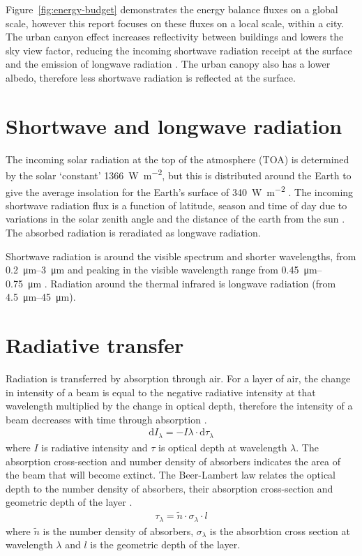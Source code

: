 \documentclass[a4paper,titlepage, twoside]{report}
\begin{document}
Figure~\ref{fig:energy-budget} demonstrates the energy balance fluxes on a global scale, however this report focuses on these fluxes on a local scale, within a city. The urban canyon effect increases reflectivity between buildings and lowers the sky view factor, reducing the incoming shortwave radiation receipt at the surface and the emission of longwave radiation \parencite{cleugh}.  The urban canopy also has a lower albedo, therefore less shortwave radiation is reflected at the surface.

\section{Shortwave and longwave radiation}
The incoming solar radiation at the top of the atmosphere (TOA) is determined by the solar `constant' \SI{1366}{\watt\per\meter\squared}, but this is distributed around the Earth to give the average insolation for the Earth's surface of \SI{340}{\watt\per\meter\squared} \parencite{ambaum}.  The incoming shortwave radiation flux is a function of latitude, season and time of day due to variations in the solar zenith angle and the distance of the earth from the sun \parencite{ambaum}.  The absorbed radiation is reradiated as longwave radiation.

Shortwave radiation is around the visible spectrum and shorter wavelengths, from \SIrange{0.2}{3}{\micro\meter} and peaking in the visible wavelength range from \SIrange{0.45}{0.75}{\micro\meter} \parencite{salby}.  Radiation around the thermal infrared is longwave radiation (from \SIrange{4.5}{45}{\micro\meter}).

\section{Radiative transfer}
\label{sec:radiative-transfer}
Radiation is transferred by absorption through air. For a layer of air,  the change in intensity of a beam is equal to the negative radiative intensity at that wavelength multiplied by the change in optical depth, therefore the intensity of a beam decreases with time through absorption \parencite{ambaum}.
\begin{align}
\mathrm{d}I_\lambda = - I\lambda \cdot \mathrm{d} \tau_\lambda
\end{align}
where $I$ is radiative intensity and $\tau$ is optical depth at wavelength $\lambda$.
The absorption cross-section and number density of absorbers indicates the area of the beam that will become extinct. The Beer-Lambert law relates the optical depth to the number density of absorbers, their absorption cross-section and geometric depth of the layer \parencite{ambaum}.
\begin{align}
\tau_\lambda = \tilde{n} \cdot \sigma_\lambda \cdot l
\end{align}
where $\tilde{n}$ is the number density of absorbers, $\sigma_\lambda$ is the absorbtion cross section at wavelength $\lambda$ and $l$ is the geometric depth of the layer.
\end{document}
